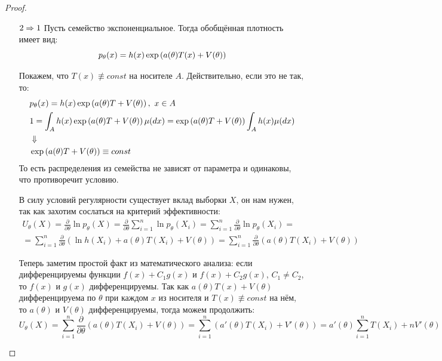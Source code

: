 \begin{proof}~
    \begin{itemize}
        \item[$2 \Rightarrow 1$] Пусть семейство экспоненциальное. Тогда обобщённая плотность имеет вид:
        \[
            p_\theta(x) = h(x) \exp \left(a(\theta) T(x) + V(\theta)\right)
        \]

        Покажем, что $T(x) \not\equiv const$ на носителе $A$. Действительно, если это не так, то:
        \begin{align*}
            & p_\theta(x) = h(x) \exp \ps{a(\theta) T + V(\theta)},\ x \in A
            \\
            & 1 = \int_A h(x) \exp \ps{a(\theta) T + V(\theta)} \mu(dx) = \exp \ps{a(\theta) T + V(\theta)} \int_A h(x) \mu(dx)
            \\
            & \Downarrow
            \\
            & \exp \ps{a(\theta) T + V(\theta)} \equiv const
        \end{align*}
        То есть распределения из семейства не зависят от параметра и одинаковы, что противоречит условию.

        В силу условий регулярности существует вклад выборки $X$, он нам нужен, так как захотим сослаться на критерий эффективности:
        \begin{multline*}
            U_\theta(X) = \frac{\partial}{\partial \theta} \ln p_\theta(X) = \frac{\partial}{\partial \theta} \sum_{i=1}^n \ln p_\theta(X_i) = \sum_{i=1}^n \frac{\partial}{\partial \theta} \ln p_\theta(X_i) =
            \\
            = \sum_{i=1}^n \frac{\partial}{\partial \theta} (\ln h(X_i) + a(\theta) T(X_i) + V(\theta)) = \sum_{i=1}^n \frac{\partial}{\partial \theta} (a(\theta) T(X_i) + V(\theta))
        \end{multline*}

        Теперь заметим простой факт из математического анализа: если дифференцируемы функции $f(x) + C_1 g(x)$ и $f(x) + C_2 g(x)$, $C_1 \neq C_2$, то $f(x)$ и $g(x)$ дифференцируемы. Так как $a(\theta) T(x) + V(\theta)$ дифференцируема по $\theta$ при каждом $x$ из носителя и $T(x) \not\equiv const$ на нём, то $a(\theta)$ и $V(\theta)$ дифференцируемы, тогда можем продолжить:
        \[
            U_\theta(X) = \sum_{i=1}^n \frac{\partial}{\partial \theta} (a(\theta) T(X_i) + V(\theta)) = \sum_{i=1}^n (a'(\theta) T(X_i) + V'(\theta)) = a'(\theta) \sum_{i=1}^n T(X_i) + n V'(\theta)
        \]


\end{itemize}
\end{proof}
